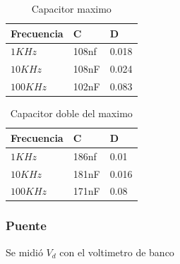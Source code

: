 \documentclass[../../main.tex]{subfiles}
\begin{document}
\begin{table}[H]
\begin{center}
\begin{tabular}{|l|l|l|}
\hline
 Frecuencia&C&D\\
\hline \hline

$ 1KHz$ &108nf&0.018  \\ \hline
$ 10KHz$  & 108nF&0.024  \\ \hline
$ 100KHz$  &102nF &0.083  \\ \hline

\end{tabular}
\caption{Capacitor maximo } 
\end{center}
\end{table}

\begin{table}[H]
\begin{center}
\begin{tabular}{|l|l|l|}
\hline
 Frecuencia&C&D\\
\hline \hline

$ 1KHz$ &186nf&0.01  \\ \hline
$ 10KHz$  & 181nF&0.016  \\ \hline
$ 100KHz$  &171nF &0.08  \\ \hline

\end{tabular}
\caption{Capacitor doble del maximo } 
\end{center}
\end{table}



\subsubsection{Puente}
Se midió $V_d$ con el voltimetro de banco
\end{document}
